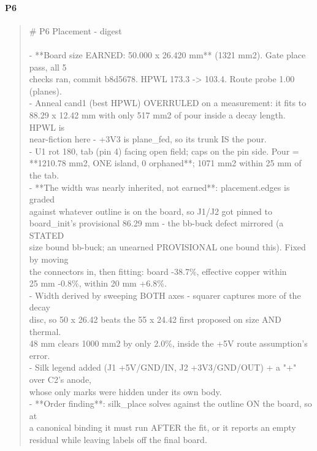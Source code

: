 \documentclass[11pt,a4paper]{article}
\begin{document}
\paragraph*{P6}
\begin{quote}\small\ttfamily\raggedright
\# P6 Placement - digest\\
~\\
- {*}{*}Board size EARNED: 50.000 x 26.420 mm{*}{*} (1321 mm2). Gate place pass, all 5\\
  checks ran, commit b8d5678. HPWL 173.3 -\textgreater{} 103.4. Route probe 1.00 (planes).\\
- Anneal cand1 (best HPWL) OVERRULED on a measurement: it fits to\\
  88.29 x 12.42 mm with only 517 mm2 of pour inside a decay length. HPWL is\\
  near-fiction here - +3V3 is plane\_fed, so its trunk IS the pour.\\
- U1 rot 180, tab (pin 4) facing open field; caps on the pin side. Pour =\\
  {*}{*}1210.78 mm2, ONE island, 0 orphaned{*}{*}; 1071 mm2 within 25 mm of the tab.\\
- {*}{*}The width was nearly inherited, not earned{*}{*}: placement.edges is graded\\
  against whatever outline is on the board, so J1/J2 got pinned to\\
  board\_init's provisional 86.29 mm - the bb-buck defect mirrored (a STATED\\
  size bound bb-buck; an unearned PROVISIONAL one bound this). Fixed by moving\\
  the connectors in, then fitting: board -38.7\%, effective copper within\\
  25 mm -0.8\%, within 20 mm +6.8\%.\\
- Width derived by sweeping BOTH axes - squarer captures more of the decay\\
  disc, so 50 x 26.42 beats the 55 x 24.42 first proposed on size AND thermal.\\
  48 mm clears 1000 mm2 by only 2.0\%, inside the +5V route assumption's error.\\
- Silk legend added (J1 +5V/GND/IN, J2 +3V3/GND/OUT) + a "+" over C2's anode,\\
  whose only marks were hidden under its own body.\\
- {*}{*}Order finding{*}{*}: silk\_place solves against the outline ON the board, so at\\
  a canonical binding it must run AFTER the fit, or it reports an empty\\
  residual while leaving labels off the final board.
\end{quote}
\end{document}
